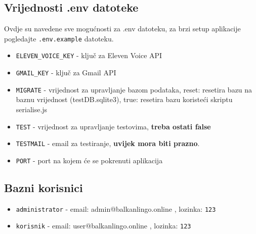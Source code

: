 		\subsection*{Vrijednosti .env datoteke}
			Ovdje su navedene sve mogućnosti za .env datoteku, za brzi setup aplikacije pogledajte \texttt{.env.example} datoteku.
			\begin{itemize}
				\item \texttt{ELEVEN\_VOICE\_KEY} - ključ za Eleven Voice API
				\item \texttt{GMAIL\_KEY} - ključ za Gmail API
				\item \texttt{MIGRATE} - vrijednost za upravljanje bazom podataka, reset: resetira bazu na baznu vrijednost (testDB.sqlite3), true: resetira bazu koristeći skriptu serialise.js
				\item \texttt{TEST} - vrijednost za upravljanje testovima, \textbf{treba ostati false}
				\item \texttt{TESTMAIL} - email za testiranje, \textbf{uvijek mora biti prazno}.
				\item \texttt{PORT} - port na kojem će se pokrenuti aplikacija
			\end{itemize}
		
		\subsection*{Bazni korisnici}
			\begin{itemize}
				\item \texttt{administrator} - email: admin@balkanlingo.online , lozinka: \texttt{123} 
				\item \texttt{korisnik} - email: user@balkanlingo.online , lozinka: \texttt{123}
			\end{itemize}
			
		\eject
